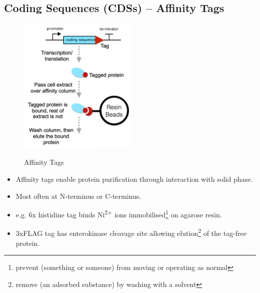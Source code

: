 \subsection{Coding Sequences (CDSs) -- Affinity Tags}
\begin{figure}[h]
\centering
\includegraphics[width=0.5\textwidth]{images/5-2.png}\\[.2in]
\caption{Affinity Tags}
\end{figure}
\FloatBarrier
\begin{itemize}
    \item Affinity tags enable protein purification through interaction with solid phase. 
    \item Most often at N-terminus or C-terminus.
    \item e.g. 6x histidine tag binds Ni\textsuperscript{2+} ions immobilised\footnote{prevent (something or someone) from moving or operating as normal} on agarose resin. 
    \item 3xFLAG tag has enterokinase cleavage site allowing elution\footnote{remove (an adsorbed substance) by washing with a solvent} of the tag-free protein.
\end{itemize}
